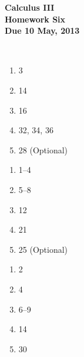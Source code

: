 \documentclass[12pt]{article}
\begin{document}
\pagestyle{empty}
 
\begin{center}
{\large {\bf Calculus III}}\\
\medskip
{\large {\bf Homework Six}}\\
\medskip
{ {\bf Due 10 May, 2013}}\\
\end{center}

\hspace{2mm}\\




\begin{enumerate}
\setlength{\itemsep}{-1mm}
  \item 3
  \item 14
  \item 16
  \item 32, 34, 36
  \item 28 (Optional)
\end{enumerate}

\begin{enumerate}
\setlength{\itemsep}{-1mm}
  \item 1--4
  \item 5--8
  \item 12
  \item 21
  \item 25 (Optional)
\end{enumerate}

\begin{enumerate}
\setlength{\itemsep}{-1mm}
  \item 2
  \item 4
  \item 6--9
  \item 14
  \item 30
\end{enumerate}
\end{document}
